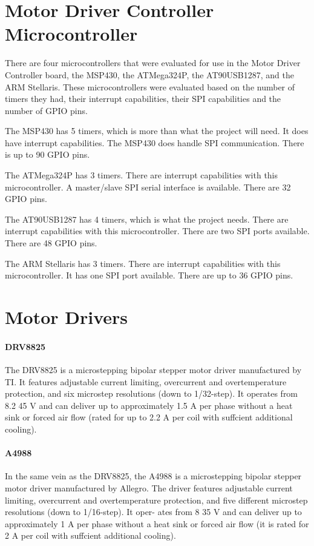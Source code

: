 \section{Motor Driver Controller Microcontroller}
There are four microcontrollers that were evaluated for use in the Motor Driver Controller board, the MSP430, the ATMega324P, the AT90USB1287, and the ARM Stellaris.
These microcontrollers were evaluated based on the number of timers they had, their interrupt capabilities, their SPI capabilities and the number of GPIO pins.

The MSP430 has 5 timers, which is more than what the project will need.
It does have interrupt capabilities.
The MSP430 does handle SPI communication. 
There is up to 90 GPIO pins.

The ATMega324P has 3 timers.
There are interrupt capabilities with this microcontroller.
A master/slave SPI serial interface is available.
There are 32 GPIO pins.   

The AT90USB1287 has 4 timers, which is what the project needs.
There are interrupt capabilities with this microcontroller.
There are two SPI ports available. 
There are 48 GPIO pins.

The ARM Stellaris has 3 timers.
There are interrupt capabilities with this microcontroller.
It has one SPI port available.
There are up to 36 GPIO pins.

\section{Motor Drivers}
\paragraph{DRV8825}
The DRV8825 is a microstepping bipolar stepper motor driver manufactured by TI.
It features adjustable current limiting, overcurrent and overtemperature protection, and six microstep resolutions (down to 1/32-step).
It operates from 8.2 45 V and can deliver up to approximately 1.5 A per phase without a heat sink or forced air ﬂow (rated for up to 2.2 A per coil with suffcient additional cooling).

\paragraph{A4988}
In the same vein as the DRV8825, the A4988 is a microstepping bipolar stepper motor driver manufactured by Allegro.
The driver features adjustable current limiting, overcurrent and overtemperature protection, and ﬁve different microstep resolutions (down to 1/16-step).
It oper- ates from 8 35 V and can deliver up to approximately 1 A per phase without a heat sink or forced air ﬂow (it is rated for 2 A per coil with suffcient additional cooling).

